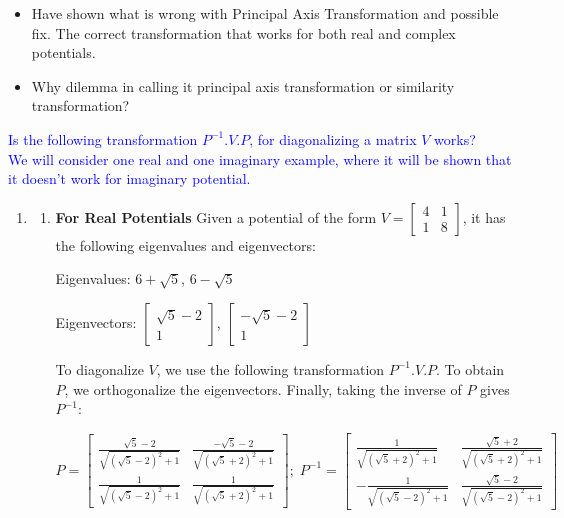 \documentclass[a4paper, 12pt]{article}
\newcommand{\anss}[1]{\textcolor{blue}{#1}}
\newcommand{\boxx}[1]{%
    \begin{tcolorbox}[colback=gray!10, colframe=gray!50, title=Where it is getting wrong?]
        #1
    \end{tcolorbox}%
}
\begin{document}
\begin{itemize}
    \item Have shown what is wrong with Principal Axis Transformation and possible fix. The correct transformation that works for both real and complex potentials.
    \item Why dilemma in calling it principal axis transformation or similarity transformation?
\end{itemize}



\anss{Is the following transformation \(P^{-1}.V.P\), for diagonalizing a matrix  $V$ works? \\ We will consider one real and one imaginary example, where it will be shown that it doesn't work for imaginary potential.}
\begin{enumerate}
\item \boxx{
    \begin{enumerate}
    \item {\bf For Real Potentials}
    Given a potential of the form \(V= \begin{bmatrix} 4 & 1 \\ 1 & 8 \end{bmatrix}\), it has the following eigenvalues and eigenvectors:

    Eigenvalues: \(6 + \sqrt{5}\), \(6 - \sqrt{5}\)

    Eigenvectors: \(\begin{bmatrix} \sqrt{5}-2 \\ 1 \end{bmatrix}\), \(\begin{bmatrix} -\sqrt{5}-2\\ 1 \end{bmatrix}\)

    To diagonalize \(V\), we use the following transformation \(P^{-1}.V.P\). To obtain \(P\), we orthogonalize the eigenvectors. Finally, taking the inverse of \(P\) gives \(P^{-1}\):

    \[P = \begin{bmatrix} \frac{\sqrt{5}-2}{\sqrt{\left(\sqrt{5}-2\right)^2+1}} & \frac{-\sqrt{5}-2}{\sqrt{\left(\sqrt{5}+2\right)^2+1}} \\ \frac{1}{\sqrt{\left(\sqrt{5}-2\right)^2+1}} & \frac{1}{\sqrt{\left(\sqrt{5}+2\right)^2+1}} \end{bmatrix};\; P^{-1} = \begin{bmatrix} \frac{1}{\sqrt{\left(\sqrt{5}+2\right)^2+1}} & \frac{\sqrt{5}+2}{\sqrt{\left(\sqrt{5}+2\right)^2+1}} \\ -\frac{1}{\sqrt{\left(\sqrt{5}-2\right)^2+1}} & \frac{\sqrt{5}-2}{\sqrt{\left(\sqrt{5}-2\right)^2+1}}\end{bmatrix}\]


\end{enumerate}}
\end{enumerate}
\end{document}

